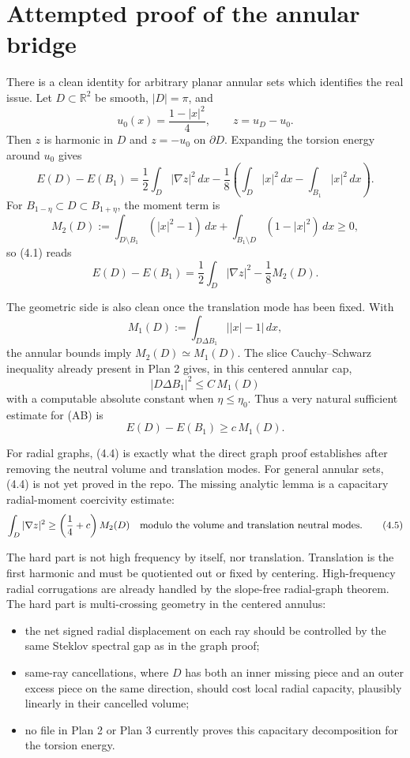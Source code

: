 \documentclass[11pt]{article}
\newcommand{\R}{\mathbb R}
\begin{document}
\section{Attempted proof of the annular bridge}

There is a clean identity for arbitrary planar annular sets which identifies
the real issue.  Let \(D\subset\R^2\) be smooth, \(|D|=\pi\), and
\[
   u_0(x)=\frac{1-|x|^2}{4},\qquad z=u_D-u_0.
\]
Then \(z\) is harmonic in \(D\) and \(z=-u_0\) on \(\partial D\).  Expanding
the torsion energy around \(u_0\) gives
\[
   E(D)-E(B_1)
     = \frac12\int_D|\nabla z|^2\,dx
       -\frac18\left(\int_D |x|^2\,dx-\int_{B_1}|x|^2\,dx\right).
   \tag{4.1}
\]
For \(B_{1-\eta}\subset D\subset B_{1+\eta}\), the moment term is
\[
   M_2(D):=
   \int_{D\setminus B_1}(|x|^2-1)\,dx
   +\int_{B_1\setminus D}(1-|x|^2)\,dx \ge0,
\]
so (4.1) reads
\[
   E(D)-E(B_1)=\frac12\int_D|\nabla z|^2-\frac18 M_2(D).
   \tag{4.2}
\]

The geometric side is also clean once the translation mode has been fixed.
With
\[
   M_1(D):=\int_{D\Delta B_1}\bigl||x|-1\bigr|\,dx,
\]
the annular bounds imply \(M_2(D)\simeq M_1(D)\).  The slice
Cauchy--Schwarz inequality already present in Plan 2 gives, in this centered
annular cap,
\[
   |D\Delta B_1|^2 \le C\,M_1(D)
   \tag{4.3}
\]
with a computable absolute constant when \(\eta\le\eta_0\).
Thus a very natural sufficient estimate for (AB) is
\[
   E(D)-E(B_1)\ge c\,M_1(D).
   \tag{4.4}
\]

For radial graphs, (4.4) is exactly what the direct graph proof establishes
after removing the neutral volume and translation modes.  For general
annular sets, (4.4) is not yet proved in the repo.  The missing analytic
lemma is a capacitary radial-moment coercivity estimate:
\[
   \int_D|\nabla z|^2
      \ge \left(\frac14+c\right)M_2(D)
        \quad\hbox{modulo the volume and translation neutral modes.}
   \tag{4.5}
\]

The hard part is not high frequency by itself, nor translation.  Translation
is the first harmonic and must be quotiented out or fixed by centering.
High-frequency radial corrugations are already handled by the slope-free
radial-graph theorem.  The hard part is multi-crossing geometry in the
centered annulus:
\begin{itemize}
\item the net signed radial displacement on each ray should be controlled by
the same Steklov spectral gap as in the graph proof;
\item same-ray cancellations, where \(D\) has both an inner missing piece
and an outer excess piece on the same direction, should cost local radial
capacity, plausibly linearly in their cancelled volume;
\item no file in Plan 2 or Plan 3 currently proves this capacitary
decomposition for the torsion energy.
\end{itemize}
\end{document}
